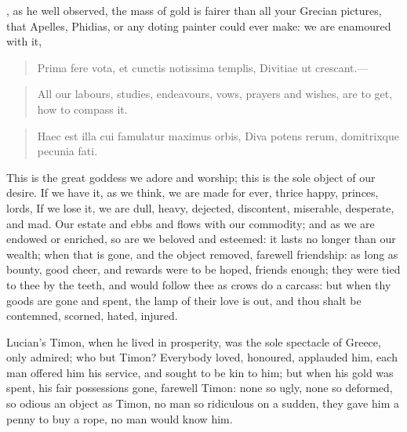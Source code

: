 {, as  he well observed, the mass of gold is
fairer than all your Grecian pictures, that Apelles, Phidias, or any
doting painter could ever make: we are enamoured with it,

\begin{latin}
\begin{verse}%
Prima fere vota, et cunctis notissima templis,
Divitiae ut crescant.---
\end{verse}%
\end{latin}
\translationrule%
\begin{verse}%
All our labours, studies, endeavours, vows, prayers and wishes, are to
get, how to compass it.
\end{verse}%

\begin{latin}
\begin{verse}%
Haec est illa cui famulatur maximus orbis,
Diva potens rerum, domitrixque pecunia fati.
\end{verse}%
\end{latin}

This is the great goddess we adore and worship; this is the sole object
of our desire. If we have it, as we think, we are made for ever, thrice
happy, princes, lords, \etc{} If we lose it, we are dull, heavy, dejected,
discontent, miserable, desperate, and mad. Our estate and 
ebbs and flows with our commodity; and as we are endowed or enriched,
so are we beloved and esteemed: it lasts no longer than our wealth;
when that is gone, and the object removed, farewell friendship: as long
as bounty, good cheer, and rewards were to be hoped, friends enough;
they were tied to thee by the teeth, and would follow thee as crows do
a carcass: but when thy goods are gone and spent, the lamp of their
love is out, and thou shalt be contemned, scorned, hated, injured.

Lucian's Timon, when he lived in prosperity, was the sole
spectacle of Greece, only admired; who but Timon? Everybody loved,
honoured, applauded him, each man offered him his service, and sought
to be kin to him; but when his gold was spent, his fair possessions
gone, farewell Timon: none so ugly, none so deformed, so odious an
object as Timon, no man so ridiculous on a sudden, they gave him a
penny to buy a rope, no man would know him.

}
